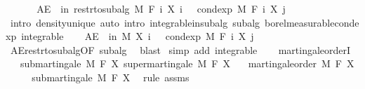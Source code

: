 \begin{isabellebody}
\ \ \isacommand{{\isacharbraceright}{\kern0pt}}\isamarkupfalse%
\isanewline
\ \ \isamarkupfalse%
\ {\isachardoublequoteopen}AE\ {\isasymxi}\ in\ restr{\isacharunderscore}{\kern0pt}to{\isacharunderscore}{\kern0pt}subalg\ M\ {\isacharparenleft}{\kern0pt}F\ i{\isacharparenright}{\kern0pt}{\isachardot}{\kern0pt}\ X\ i\ {\isasymxi}\ {\isacharequal}{\kern0pt}\ cond{\isacharunderscore}{\kern0pt}exp\ M\ {\isacharparenleft}{\kern0pt}F\ i{\isacharparenright}{\kern0pt}\ {\isacharparenleft}{\kern0pt}X\ j{\isacharparenright}{\kern0pt}\ {\isasymxi}{\isachardoublequoteclose}\ \isamarkupfalse%
\ {\isacharparenleft}{\kern0pt}intro\ density{\isacharunderscore}{\kern0pt}unique{\isacharcomma}{\kern0pt}\ auto\ intro{\isacharcolon}{\kern0pt}\ integrable{\isacharunderscore}{\kern0pt}in{\isacharunderscore}{\kern0pt}subalg\ subalg\ borel{\isacharunderscore}{\kern0pt}measurable{\isacharunderscore}{\kern0pt}cond{\isacharunderscore}{\kern0pt}exp\ integrable{\isacharparenright}{\kern0pt}\isanewline
\ \ \isamarkupfalse%
\ {\isachardoublequoteopen}AE\ {\isasymxi}\ in\ M{\isachardot}{\kern0pt}\ X\ i\ {\isasymxi}\ {\isacharequal}{\kern0pt}\ cond{\isacharunderscore}{\kern0pt}exp\ M\ {\isacharparenleft}{\kern0pt}F\ i{\isacharparenright}{\kern0pt}\ {\isacharparenleft}{\kern0pt}X\ j{\isacharparenright}{\kern0pt}\ {\isasymxi}{\isachardoublequoteclose}\ \isamarkupfalse%
\ AE{\isacharunderscore}{\kern0pt}restr{\isacharunderscore}{\kern0pt}to{\isacharunderscore}{\kern0pt}subalg{\isacharbrackleft}{\kern0pt}OF\ subalg{\isacharbrackright}{\kern0pt}\ \isamarkupfalse%
\ blast\isanewline
{}\isamarkupfalse%
\ {\isacharparenleft}{\kern0pt}simp\ add{\isacharcolon}{\kern0pt}\ integrable{\isacharparenright}{\kern0pt}%
\endisatagproof
{\isafoldproof}%
%
\isadelimproof
\isanewline
%
\endisadelimproof
\ \ \isanewline
{}\isamarkupfalse%
\ martingale{\isacharunderscore}{\kern0pt}orderI{\isacharcolon}{\kern0pt}\isanewline
\ \ \ {\isachardoublequoteopen}submartingale\ M\ F\ X{\isachardoublequoteclose}\ {\isachardoublequoteopen}supermartingale\ M\ F\ X{\isachardoublequoteclose}\isanewline
\ \ \ {\isachardoublequoteopen}martingale{\isacharunderscore}{\kern0pt}order\ M\ F\ X{\isachardoublequoteclose}\ \isanewline
%
\isadelimproof
%
\endisadelimproof
%
\isatagproof
{}\isamarkupfalse%
\ {\isacharminus}{\kern0pt}\isanewline
\ \ \isamarkupfalse%
\ submartingale\ M\ F\ X\ \isamarkupfalse%
\ {\isacharparenleft}{\kern0pt}rule\ assms{\isacharparenright}{\kern0pt}\isanewline

\end{isabellebody}
